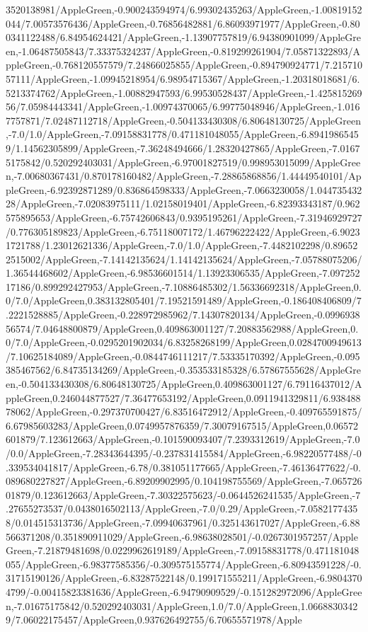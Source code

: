 {\begin{tikzternal}
3520138981/AppleGreen,-0.900243594974/6.99302435263/AppleGreen,-1.00819152044/7.00573576436/AppleGreen,-0.76856482881/6.86093971977/AppleGreen,-0.800341122488/6.84954624421/AppleGreen,-1.13907757819/6.94380901099/AppleGreen,-1.06487505843/7.33375324237/AppleGreen,-0.819299261904/7.05871322893/AppleGreen,-0.768120557579/7.24866025855/AppleGreen,-0.894790924771/7.21571057111/AppleGreen,-1.09945218954/6.98954715367/AppleGreen,-1.20318018681/6.5213374762/AppleGreen,-1.00882947593/6.99530528437/AppleGreen,-1.42581526956/7.05984443341/AppleGreen,-1.00974370065/6.99775048946/AppleGreen,-1.0167757871/7.02487112718/AppleGreen,-0.504133430308/6.80648130725/AppleGreen,-7.0/1.0/AppleGreen,-7.09158831778/0.471181048055/AppleGreen,-6.89419865459/1.14562305899/AppleGreen,-7.36248494666/1.28320427865/AppleGreen,-7.01675175842/0.520292403031/AppleGreen,-6.97001827519/0.998953015099/AppleGreen,-7.00680367431/0.870178160482/AppleGreen,-7.28865868856/1.44449540101/AppleGreen,-6.92392871289/0.836864598333/AppleGreen,-7.0663230058/1.04473543228/AppleGreen,-7.02083975111/1.02158019401/AppleGreen,-6.82393343187/0.962575895653/AppleGreen,-6.75742606843/0.9395195261/AppleGreen,-7.31946929727/0.776305189823/AppleGreen,-6.75118007172/1.46796222422/AppleGreen,-6.90231721788/1.23012621336/AppleGreen,-7.0/1.0/AppleGreen,-7.4482102298/0.896522515002/AppleGreen,-7.14142135624/1.14142135624/AppleGreen,-7.05788075206/1.36544468602/AppleGreen,-6.98536601514/1.13923306535/AppleGreen,-7.09725217186/0.899292427953/AppleGreen,-7.10886485302/1.56336692318/AppleGreen,0.0/7.0/AppleGreen,0.383132805401/7.19521591489/AppleGreen,-0.186408406809/7.2221528885/AppleGreen,-0.228972985962/7.14307820134/AppleGreen,-0.099693856574/7.04648800879/AppleGreen,0.409863001127/7.20883562988/AppleGreen,0.0/7.0/AppleGreen,-0.0295201902034/6.83258268199/AppleGreen,0.0284700949613/7.10625184089/AppleGreen,-0.0844746111217/7.53335170392/AppleGreen,-0.095385467562/6.84735134269/AppleGreen,-0.353533185328/6.57867555628/AppleGreen,-0.504133430308/6.80648130725/AppleGreen,0.409863001127/6.79116437012/AppleGreen,0.246044877527/7.36477653192/AppleGreen,0.0911941329811/6.93848878062/AppleGreen,-0.297370700427/6.83516472912/AppleGreen,-0.409765591875/6.67985603283/AppleGreen,0.0749957876359/7.30079167515/AppleGreen,0.06572601879/7.123612663/AppleGreen,-0.101590093407/7.2393312619/AppleGreen,-7.0/0.0/AppleGreen,-7.28343644395/-0.237831415584/AppleGreen,-6.98220577488/-0.339534041817/AppleGreen,-6.78/0.381051177665/AppleGreen,-7.46136477622/-0.089680227827/AppleGreen,-6.89209902995/0.104198755569/AppleGreen,-7.06572601879/0.123612663/AppleGreen,-7.30322575623/-0.0644526241535/AppleGreen,-7.27655273537/0.0438016502113/AppleGreen,-7.0/0.29/AppleGreen,-7.05821774358/0.014515313736/AppleGreen,-7.09940637961/0.325143617027/AppleGreen,-6.88566371208/0.351890911029/AppleGreen,-6.98638028501/-0.0267301957257/AppleGreen,-7.21879481698/0.0229962619189/AppleGreen,-7.09158831778/0.471181048055/AppleGreen,-6.98377585356/-0.309575155774/AppleGreen,-6.80943591228/-0.31715190126/AppleGreen,-6.83287522148/0.199171555211/AppleGreen,-6.98043704799/-0.00415823381636/AppleGreen,-6.94790909529/-0.151282972096/AppleGreen,-7.01675175842/0.520292403031/AppleGreen,1.0/7.0/AppleGreen,1.06688303429/7.06022175457/AppleGreen,0.937626492755/6.70655571978/Apple
\end{tikzternal}}
